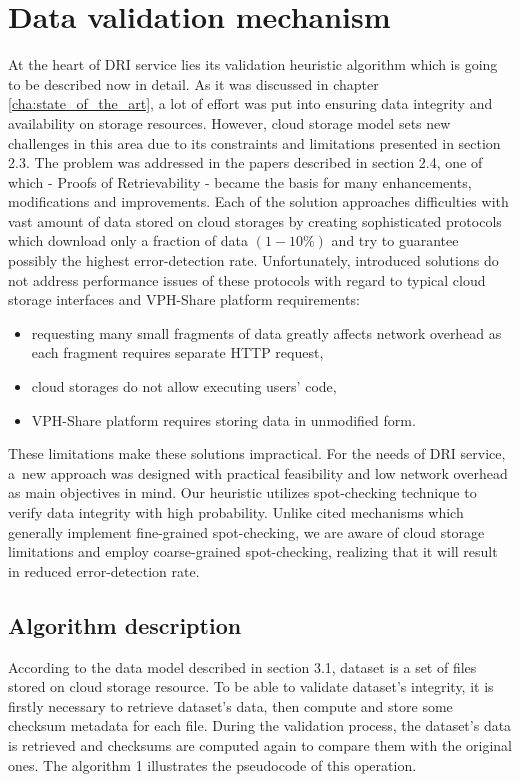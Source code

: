 	\section{Data validation mechanism}
	\label{section:validation-algorithm}
At the heart of DRI service lies its validation heuristic algorithm which is
going to be described now in detail. As it was discussed in chapter 
\ref{cha:state_of_the_art}, a lot of 
effort was put into ensuring data integrity and availability on storage
resources. However, cloud storage model sets new challenges in this area due to
its constraints and limitations presented in section 2.3. The problem was
addressed in the papers described in section 2.4, one of which - Proofs of
Retrievability - became the basis for many enhancements, modifications and
improvements. Each of the solution approaches difficulties with vast amount of
data stored on cloud storages by creating sophisticated protocols which download
only a fraction of data $(1-10\%)$ and try to guarantee possibly the highest
error-detection rate. Unfortunately, introduced solutions do not address
performance issues of these protocols with regard to typical cloud storage
interfaces and VPH-Share platform requirements:

\begin{itemize}
	\item requesting many small fragments of data greatly affects network
	overhead as each fragment requires separate HTTP request,
	\item cloud storages do not allow executing users' code,
	\item VPH-Share platform requires storing data in unmodified form.
\end{itemize}

These limitations make these solutions impractical. For the needs of DRI
service, a~new approach was designed with practical feasibility and low network
overhead as main objectives in mind. Our heuristic utilizes spot-checking
technique to verify data integrity with high
probability. Unlike cited mechanisms \cite{dip, por} which generally implement
fine-grained spot-checking, we are aware of cloud storage limitations and
employ coarse-grained spot-checking, realizing that it will result in reduced
error-detection rate.

		\subsection{Algorithm description}
According to the data model described in section 3.1, dataset is a set of files
stored on cloud storage resource. To be able to validate dataset's integrity,
it is firstly necessary to retrieve dataset's data, then compute and store some
checksum metadata for each file. During the validation process, the dataset's
data is retrieved and checksums are computed again to compare them with the
original ones. The algorithm 1 illustrates the pseudocode
of this operation.\\

